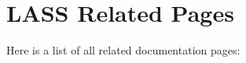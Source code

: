 \section{LASS Related Pages}
Here is a list of all related documentation pages:\begin{CompactList}
\item {}

\item {}

\end{CompactList}
